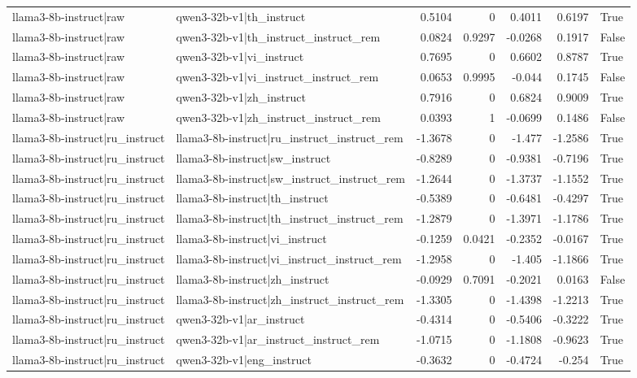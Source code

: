 \begin{table}
\begin{tabular}{l l r r r r l}
llama3-8b-instruct|raw & qwen3-32b-v1|th_instruct & 0.5104 & 0 & 0.4011 & 0.6197 & True \\
llama3-8b-instruct|raw & qwen3-32b-v1|th_instruct_instruct_rem & 0.0824 & 0.9297 & -0.0268 & 0.1917 & False \\
llama3-8b-instruct|raw & qwen3-32b-v1|vi_instruct & 0.7695 & 0 & 0.6602 & 0.8787 & True \\
llama3-8b-instruct|raw & qwen3-32b-v1|vi_instruct_instruct_rem & 0.0653 & 0.9995 & -0.044 & 0.1745 & False \\
llama3-8b-instruct|raw & qwen3-32b-v1|zh_instruct & 0.7916 & 0 & 0.6824 & 0.9009 & True \\
llama3-8b-instruct|raw & qwen3-32b-v1|zh_instruct_instruct_rem & 0.0393 & 1 & -0.0699 & 0.1486 & False \\
llama3-8b-instruct|ru_instruct & llama3-8b-instruct|ru_instruct_instruct_rem & -1.3678 & 0 & -1.477 & -1.2586 & True \\
llama3-8b-instruct|ru_instruct & llama3-8b-instruct|sw_instruct & -0.8289 & 0 & -0.9381 & -0.7196 & True \\
llama3-8b-instruct|ru_instruct & llama3-8b-instruct|sw_instruct_instruct_rem & -1.2644 & 0 & -1.3737 & -1.1552 & True \\
llama3-8b-instruct|ru_instruct & llama3-8b-instruct|th_instruct & -0.5389 & 0 & -0.6481 & -0.4297 & True \\
llama3-8b-instruct|ru_instruct & llama3-8b-instruct|th_instruct_instruct_rem & -1.2879 & 0 & -1.3971 & -1.1786 & True \\
llama3-8b-instruct|ru_instruct & llama3-8b-instruct|vi_instruct & -0.1259 & 0.0421 & -0.2352 & -0.0167 & True \\
llama3-8b-instruct|ru_instruct & llama3-8b-instruct|vi_instruct_instruct_rem & -1.2958 & 0 & -1.405 & -1.1866 & True \\
llama3-8b-instruct|ru_instruct & llama3-8b-instruct|zh_instruct & -0.0929 & 0.7091 & -0.2021 & 0.0163 & False \\
llama3-8b-instruct|ru_instruct & llama3-8b-instruct|zh_instruct_instruct_rem & -1.3305 & 0 & -1.4398 & -1.2213 & True \\
llama3-8b-instruct|ru_instruct & qwen3-32b-v1|ar_instruct & -0.4314 & 0 & -0.5406 & -0.3222 & True \\
llama3-8b-instruct|ru_instruct & qwen3-32b-v1|ar_instruct_instruct_rem & -1.0715 & 0 & -1.1808 & -0.9623 & True \\
llama3-8b-instruct|ru_instruct & qwen3-32b-v1|eng_instruct & -0.3632 & 0 & -0.4724 & -0.254 & True \\

\end{tabular}
\end{table}
